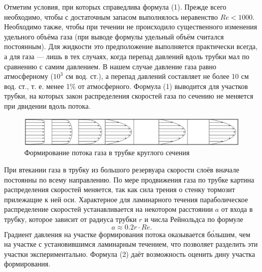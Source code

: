 \documentclass[a4paper, fontsize=14pt]{article}
\begin{document}
Отметим условия, при которых справедлива формула (1). Прежде всего необходимо, чтобы с достаточным запасом выполнялось неравенство $Re < 1000$. Необходимо также, чтобы при течении не происходило существенного изменения удельного объёма газа (при выводе формулы удельный объём считался постоянным). Для жидкости это предположение выполняется практически всегда, а для газа --- лишь в тех случаях, когда перепад давлений вдоль трубки мал по сравнению с самим давлением. В нашем случае давление газа равно атмосферному ($10^3$ см вод. ст.), а перепад давлений составляет не более 10 см вод. ст., т. е. менее 1\% от атмосферного. Формула (1) выводится для участков трубки, на которых закон распределения скоростей газа по сечению не меняется при двидении вдоль потока.
\begin{figure}[H]
\center
\includegraphics[scale=0.25]{potok.png}
\caption{Формирование потока газа в трубке круглого сечения}
\end{figure}
При втекании газа в трубку из большого резервуара скорости слоёв вначале постоянны по всему направлению. По мере продвижения газа по трубке картина распределения скоростей меняется, так как сила трения о стенку тормозит прилежащие к ней оси. Характерное для ламинарного течения параболическое распределение скоростей устанавливается на некотором расстоянии $a$ от входа в трубку, которое зависит от радиуса трубки $r$ и числа Рейнольдса по формуле 
\begin{equation}
	a \approx 0.2 r \cdot Re.
\end{equation}
Градиент давления на участке формирования потока оказывается б\'{о}льшим, чем на участке с установившимся ламинарным течением, что позволяет разделить эти участки экспериментально. Формула (2) даёт возможность оценить дину участка формирования.
\newpage
\end{document}
